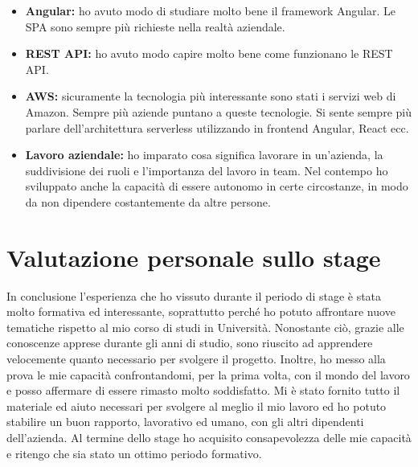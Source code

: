 \begin{itemize}
	\item \textbf{Angular:} ho avuto modo di studiare molto bene il framework Angular. Le SPA sono sempre più richieste nella realtà aziendale. 
	\item \textbf{REST API:} ho avuto modo capire molto bene come funzionano le REST API. 
	\item \textbf{AWS:} sicuramente la tecnologia più interessante sono stati i servizi web di Amazon. Sempre più aziende puntano a queste tecnologie. Si sente sempre più parlare dell'architettura serverless utilizzando in frontend Angular, React ecc.
	\item \textbf{Lavoro aziendale:}  ho imparato cosa significa lavorare in un’azienda,
	la suddivisione dei ruoli e l’importanza del lavoro in team. Nel
	contempo ho sviluppato anche la capacità di essere autonomo in certe
	circostanze, in modo da non dipendere costantemente da altre persone.
\end{itemize}
\section{Valutazione personale sullo stage}
In conclusione l’esperienza che ho vissuto durante il periodo di stage è stata
molto formativa ed interessante, soprattutto perché ho potuto affrontare
nuove tematiche rispetto al mio corso di studi in Università. Nonostante
ciò, grazie alle conoscenze apprese durante gli anni di studio, sono riuscito ad
apprendere velocemente quanto necessario per svolgere il progetto. Inoltre,
ho messo alla prova le mie capacità confrontandomi, per la prima volta, con
il mondo del lavoro e posso affermare di essere rimasto molto soddisfatto. Mi è stato fornito tutto il materiale ed
aiuto necessari per svolgere al meglio il mio lavoro ed ho potuto stabilire un
buon rapporto, lavorativo ed umano, con gli altri dipendenti dell’azienda. Al
termine dello stage ho acquisito consapevolezza delle mie capacità e ritengo
che sia stato un ottimo periodo formativo.
